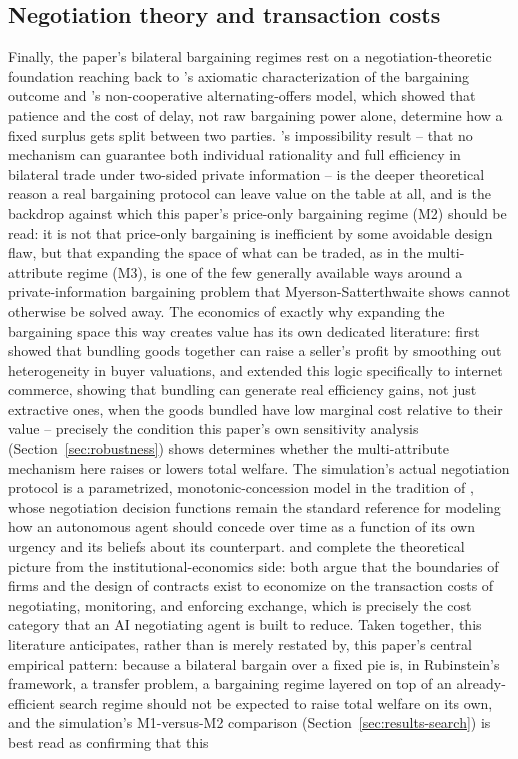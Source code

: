 \documentclass[review]{elsarticle}
\begin{document}
\subsection{Negotiation theory and transaction costs}
\label{sec:litreview-negotiation}

Finally, the paper's bilateral bargaining regimes rest on a negotiation-theoretic foundation reaching back to \citet{nash1950bargaining}'s axiomatic characterization of the bargaining outcome and \citet{rubinstein1982perfect}'s non-cooperative alternating-offers model, which showed that patience and the cost of delay, not raw bargaining power alone, determine how a fixed surplus gets split between two parties. \citet{myerson1983efficient}'s impossibility result -- that no mechanism can guarantee both individual rationality and full efficiency in bilateral trade under two-sided private information -- is the deeper theoretical reason a real bargaining protocol can leave value on the table at all, and is the backdrop against which this paper's price-only bargaining regime (M2) should be read: it is not that price-only bargaining is inefficient by some avoidable design flaw, but that expanding the space of what can be traded, as in the multi-attribute regime (M3), is one of the few generally available ways around a private-information bargaining problem that Myerson-Satterthwaite shows cannot otherwise be solved away. The economics of exactly why expanding the bargaining space this way creates value has its own dedicated literature: \citet{adams1976commodity} first showed that bundling goods together can raise a seller's profit by smoothing out heterogeneity in buyer valuations, and \citet{bakos2000bundling} extended this logic specifically to internet commerce, showing that bundling can generate real efficiency gains, not just extractive ones, when the goods bundled have low marginal cost relative to their value -- precisely the condition this paper's own sensitivity analysis (Section~\ref{sec:robustness}) shows determines whether the multi-attribute mechanism here raises or lowers total welfare. The simulation's actual negotiation protocol is a parametrized, monotonic-concession model in the tradition of \citet{faratin1998negotiation}, whose negotiation decision functions remain the standard reference for modeling how an autonomous agent should concede over time as a function of its own urgency and its beliefs about its counterpart. \citet{williamson1981economics} and \citet{coase1937nature} complete the theoretical picture from the institutional-economics side: both argue that the boundaries of firms and the design of contracts exist to economize on the transaction costs of negotiating, monitoring, and enforcing exchange, which is precisely the cost category that an AI negotiating agent is built to reduce. Taken together, this literature anticipates, rather than is merely restated by, this paper's central empirical pattern: because a bilateral bargain over a fixed pie is, in Rubinstein's framework, a transfer problem, a bargaining regime layered on top of an already-efficient search regime should not be expected to raise total welfare on its own, and the simulation's M1-versus-M2 comparison (Section~\ref{sec:results-search}) is best read as confirming that this 
\end{document}
